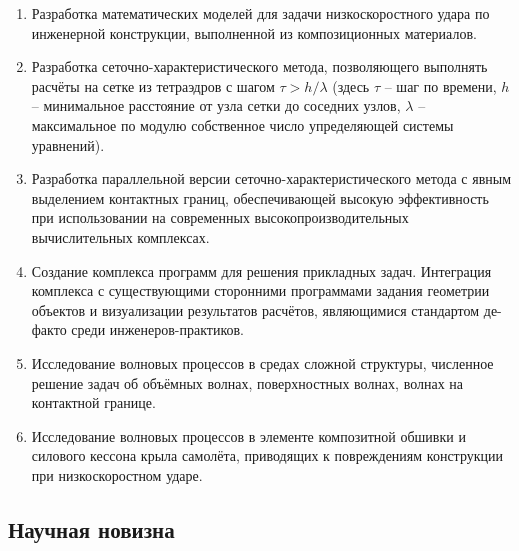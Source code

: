 \begin{enumerate}
\item Разработка математических моделей для задачи низкоскоростного удара по инженерной конструкции, выполненной из композиционных материалов.
\item Разработка сеточно-характеристического метода, позволяющего выполнять расчёты на сетке из тетраэдров с шагом $\tau > h / \lambda$ (здесь $\tau$ -- шаг по времени, $h$ -- минимальное расстояние от узла сетки до соседних узлов, $\lambda$ -- максимальное по модулю собственное число упределяющей системы уравнений).
\item Разработка параллельной версии сеточно-характеристического метода с явным выделением контактных границ, обеспечивающей высокую эффективность при использовании на современных высокопроизводительных вычислительных комплексах.
\item Создание комплекса программ для решения прикладных задач. Интеграция комплекса с существующими сторонними программами задания геометрии объектов и визуализации результатов расчётов, являющимися стандартом де-факто среди инженеров-практиков.
\item Исследование волновых процессов в средах сложной структуры, численное решение задач об объёмных волнах, поверхностных волнах, волнах на контактной границе.
\item Исследование волновых процессов в элементе композитной обшивки и силового кессона крыла самолёта, приводящих к повреждениям конструкции при низкоскоростном ударе.
\end{enumerate}

\subsection*{Научная новизна}

